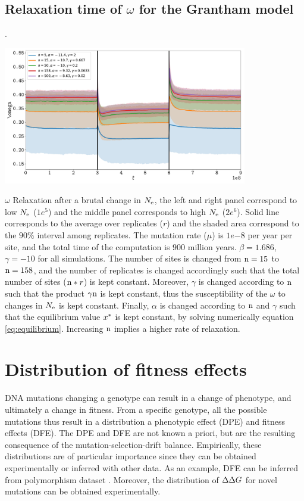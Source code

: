 \documentclass{article}
\renewcommand*{\bm}[1]{#1}%
\begin{document}
\subsection{Relaxation time of $\bm{\omega}$ for the Grantham model}.
\begin{center}
 \includegraphics[width=0.8\textwidth] {artworks/Relaxation-Stability-Grantham-Alpha-Gamma.pdf}
\end{center}
$\omega$ Relaxation after a brutal change in $N_{\mathrm{e}}$, the left and right panel correspond to low $N_{\mathrm{e}}$ ($1e^{5}$) and the middle panel corresponds to high $N_{\mathrm{e}}$ ($2e^{6}$). 
Solid line corresponds to the average over replicates ($r$) and the shaded area correspond to the $90\%$ interval among replicates. 
The mutation rate ($\mu$) is $1e{-8}$ per year per site, and the total time of the computation is $900$ million years.
$\beta=1.686$, $\gamma=-10$ for all simulations. The number of sites is changed from $\text{n}=15$ to $\text{n}=158$, and the number of replicates is changed accordingly such that the total number of sites ($\text{n}*r$) is kept constant.
Moreover, $\gamma$ is changed according to $\text{n}$ such that the product $\gamma\text{n}$ is kept constant, thus the  susceptibility of the $\omega$ to changes in $N_{\mathrm{e}}$ is kept constant.
Finally, $\alpha$ is changed according to $\text{n}$ and $\gamma$ such that the equilibrium value $x^{*}$ is kept constant, by solving numerically equation \ref{eq:equilibrium}.
Increasing $\text{n}$ implies a higher rate of relaxation.

\section{Distribution of fitness effects}
DNA mutations changing a genotype can result in a change of phenotype, and ultimately a change in fitness.
From a specific genotype, all the possible mutations thus result in a distribution a phenotypic effect (DPE) and fitness effects (DFE).
The DPE and DFE are not known a priori, but are the resulting consequence of the mutation-selection-drift balance.
Empirically, these distributions are of particular importance since they can be obtained experimentally or inferred with other data.
As an example, DFE can be inferred from polymorphism dataset \citep{Eyre-walker2007, Galtier2016}. 
Moreover, the distribution of $\Delta \Delta G$ for novel mutations can be obtained experimentally.
\end{document}
